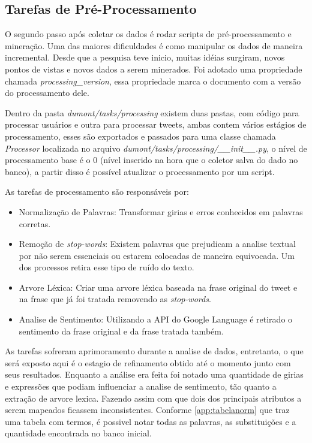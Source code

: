 \subsection{Tarefas de Pré-Processamento}
O segundo passo após coletar os dados é rodar scripts de pré-processamento e mineração. Uma das maiores dificuldades é como manipular os dados de maneira incremental. Desde que a pesquisa teve inicio, muitas idéias surgiram, novos pontos de vistas e novos dados a serem minerados. Foi adotado uma propriedade chamada \textit{processing\_version}, essa propriedade marca o documento com a versão do processamento dele.

Dentro da pasta \textit{dumont/tasks/processing} existem duas pastas, com código para processar usuários e outra para processar tweets, ambas contem vários estágios de processamento, esses são exportados e passados para uma classe chamada \textit{Processor} localizada no arquivo \textit{dumont/tasks/processing/\_\_init\_\_.py}, o nível de processamento base é o 0 (nível inserido na hora que o coletor salva do dado no banco), a partir disso é possível atualizar o processamento por um script.

As tarefas de processamento são responsáveis por:

\begin{itemize}
    \item Normalização de Palavras: Transformar girias e erros conhecidos em palavras corretas.
    \item Remoção de \textit{stop-words}: Existem palavras que prejudicam a analise textual por não serem essenciais ou estarem colocadas de maneira equivocada. Um dos processos retira esse tipo de ruído do texto.
    \item Arvore Léxica: Criar uma arvore léxica baseada na frase original do tweet e na frase que já foi tratada removendo as \textit{stop-words}.
    \item Analise de Sentimento: Utilizando a API do Google Language é retirado o sentimento da frase original e da frase tratada também.
\end{itemize}

As tarefas sofreram aprimoramento durante a analise de dados, entretanto, o que será exposto aqui é o estagio de refinamento obtido até o momento junto com seus resultados. Enquanto a análise era feita foi notado uma quantidade de girias e expressões que podiam influenciar a analise de sentimento, tão quanto a extração de arvore lexica. Fazendo assim com que dois dos principais atributos a serem mapeados ficassem inconsistentes. Conforme \ref{app:tabelanorm} que traz uma tabela com termos, é possivel notar todas as palavras, as substituições e a quantidade encontrada no banco inicial.


